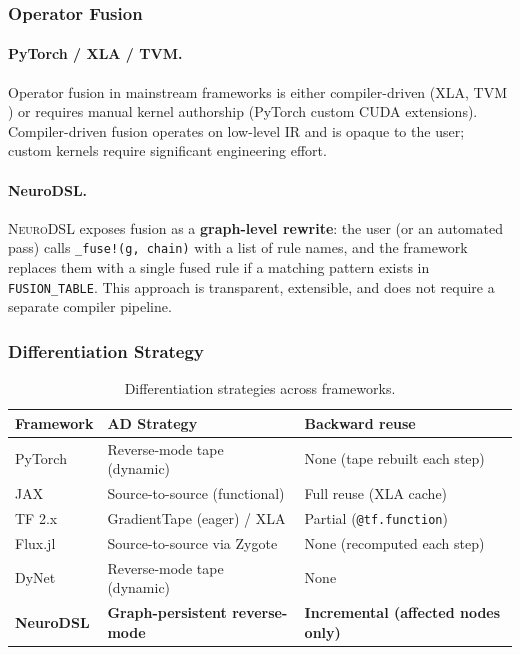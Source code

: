 \documentclass{article}
\begin{document}
\subsubsection{Operator Fusion}
\paragraph{PyTorch / XLA / TVM.} Operator fusion in mainstream frameworks is either compiler-driven (XLA, TVM \cite{tvm}) or requires manual kernel authorship (PyTorch custom CUDA extensions). Compiler-driven fusion operates on low-level IR and is opaque to the user; custom kernels require significant engineering effort.

\paragraph{NeuroDSL.} \textsc{NeuroDSL} exposes fusion as a \textbf{graph-level rewrite}: the user (or an automated pass) calls \texttt{\_fuse!(g, chain)} with a list of rule names, and the framework replaces them with a single fused rule if a matching pattern exists in \texttt{FUSION\_TABLE}. This approach is transparent, extensible, and does not require a separate compiler pipeline.

\subsubsection{Differentiation Strategy}
\begin{table}[H]
\centering
\caption{Differentiation strategies across frameworks.}
\label{tab:autodiff}
\small
\renewcommand{\arraystretch}{1.2}
\begin{tabular}{lll}
\toprule
\textbf{Framework} & \textbf{AD Strategy} & \textbf{Backward reuse} \\
\midrule
PyTorch  & Reverse-mode tape (dynamic)            & None (tape rebuilt each step) \\
JAX      & Source-to-source (functional)          & Full reuse (XLA cache) \\
TF 2.x   & GradientTape (eager) / XLA             & Partial (\texttt{@tf.function}) \\
Flux.jl  & Source-to-source via Zygote            & None (recomputed each step) \\
DyNet    & Reverse-mode tape (dynamic)            & None \\
\textbf{NeuroDSL} & \textbf{Graph-persistent reverse-mode} & \textbf{Incremental (affected nodes only)} \\
\bottomrule
\end{tabular}
\end{table}
\end{document}
